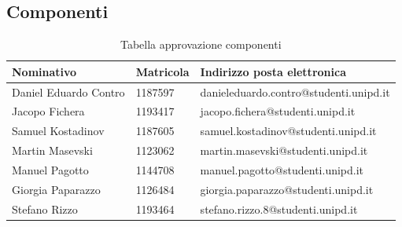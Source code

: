 \documentclass[../piano_di_progetto.tex]{subfiles}
\begin{document}
\newpage
\subsection{Componenti}%
\label{sub:comp}

\begin{table}[!ht]
	\centering
	\begin{tabular}{|l|l|l|}
		\hline
		\rowcolor{lightgray}
		\textbf{Nominativo} & \textbf{Matricola} & \textbf{Indirizzo posta elettronica} \\ 
		\hline
		Daniel Eduardo Contro & 1187597 & danieleduardo.contro@studenti.unipd.it \\ 
		\hline
		Jacopo Fichera & 1193417  & jacopo.fichera@studenti.unipd.it \\ 
		\hline
		Samuel Kostadinov & 1187605 & samuel.kostadinov@studenti.unipd.it \\ 
		\hline
		Martin Masevski & 1123062 & martin.masevski@studenti.unipd.it \\ 
		\hline
		Manuel Pagotto & 1144708 & manuel.pagotto@studenti.unipd.it \\ 
		\hline
		Giorgia Paparazzo & 1126484 & giorgia.paparazzo@studenti.unipd.it \\ 
		\hline
		Stefano Rizzo & 1193464 & stefano.rizzo.8@studenti.unipd.it \\ 
		\hline
	\end{tabular}
		\caption{Tabella approvazione componenti}
\end{table}
\end{document}
